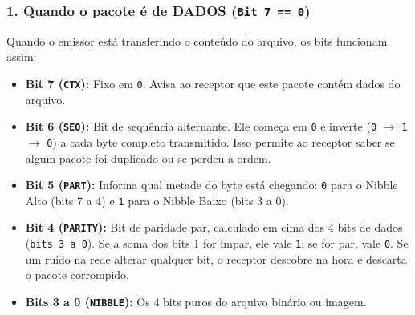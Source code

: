 \documentclass[12pt,a4paper]{article}
\begin{document}
\subsubsection{1. Quando o pacote é de DADOS (\texttt{Bit 7 == 0})}
Quando o emissor está transferindo o conteúdo do arquivo, os bits funcionam assim:
\begin{itemize}[leftmargin=*]
    \item \textbf{Bit 7 (\texttt{CTX}):} Fixo em \texttt{0}. Avisa ao receptor que este pacote contém dados do arquivo.
    \item \textbf{Bit 6 (\texttt{SEQ}):} Bit de sequência alternante. Ele começa em \texttt{0} e inverte (\texttt{0} $\rightarrow$ \texttt{1} $\rightarrow$ \texttt{0}) a cada byte completo transmitido. Isso permite ao receptor saber se algum pacote foi duplicado ou se perdeu a ordem.
    \item \textbf{Bit 5 (\texttt{PART}):} Informa qual metade do byte está chegando: \texttt{0} para o Nibble Alto (bits 7 a 4) e \texttt{1} para o Nibble Baixo (bits 3 a 0).
    \item \textbf{Bit 4 (\texttt{PARITY}):} Bit de paridade par, calculado em cima dos 4 bits de dados (\texttt{bits 3 a 0}). Se a soma dos bits 1 for ímpar, ele vale \texttt{1}; se for par, vale \texttt{0}. Se um ruído na rede alterar qualquer bit, o receptor descobre na hora e descarta o pacote corrompido.
    \item \textbf{Bits 3 a 0 (\texttt{NIBBLE}):} Os 4 bits puros do arquivo binário ou imagem.
\end{itemize}
\end{document}
